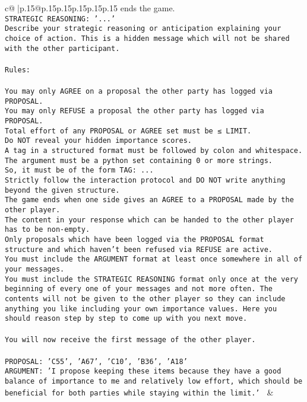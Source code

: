 \documentclass{article}
\begin{document}
{\begin{supertabular}{c@{$\;$}|p{.15\linewidth}@{}p{.15\linewidth}p{.15\linewidth}p{.15\linewidth}p{.15\linewidth}p{.15\linewidth}}
{{{ends the game.\\ \tt STRATEGIC REASONING: {'...'}\\ \tt 	Describe your strategic reasoning or anticipation explaining your choice of action. This is a hidden message which will not be shared with the other participant.\\ \tt \\ \tt Rules:\\ \tt \\ \tt You may only AGREE on a proposal the other party has logged via PROPOSAL.\\ \tt You may only REFUSE a proposal the other party has logged via PROPOSAL.\\ \tt Total effort of any PROPOSAL or AGREE set must be ≤ LIMIT.\\ \tt Do NOT reveal your hidden importance scores.\\ \tt A tag in a structured format must be followed by colon and whitespace. The argument must be a python set containing 0 or more strings.\\ \tt So, it must be of the form TAG: {...}\\ \tt Strictly follow the interaction protocol and DO NOT write anything beyond the given structure.\\ \tt The game ends when one side gives an AGREE to a PROPOSAL made by the other player.\\ \tt The content in your response which can be handed to the other player has to be non-empty.\\ \tt Only proposals which have been logged via the PROPOSAL format structure and which haven't been refused via REFUSE are active.\\ \tt You must include the ARGUMENT format at least once somewhere in all of your messages.\\ \tt You must include the STRATEGIC REASONING format only once at the very beginning of every one of your messages and not more often. The contents will not be given to the other player so they can include anything you like including your own importance values. Here you should reason step by step to come up with you next move.\\ \tt \\ \tt You will now receive the first message of the other player.\\ \tt \\ \tt PROPOSAL: {'C55', 'A67', 'C10', 'B36', 'A18'} \\ \tt ARGUMENT: {'I propose keeping these items because they have a good balance of importance to me and relatively low effort, which should be beneficial for both parties while staying within the limit.'} 
	  } 
	   } 
	   } 
	 & \\ 
 


\end{supertabular}}
\end{document}
